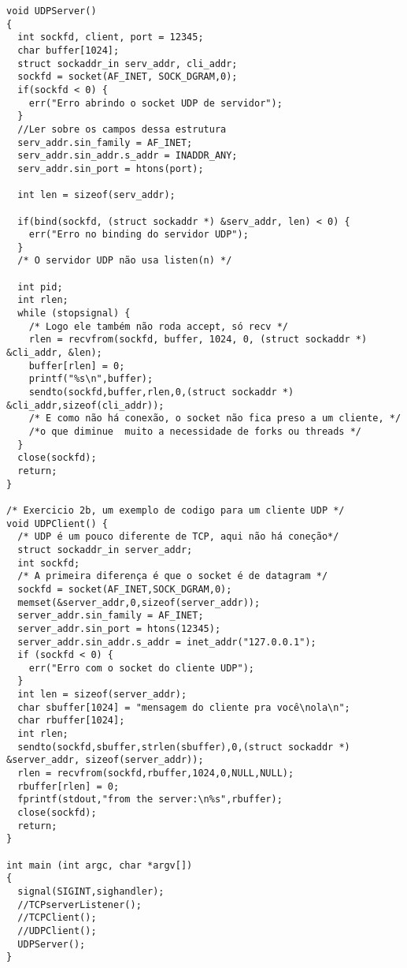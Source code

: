 \documentclass{article}
\begin{document}
\begin{verbatim}
void UDPServer()
{
  int sockfd, client, port = 12345;
  char buffer[1024];
  struct sockaddr_in serv_addr, cli_addr;
  sockfd = socket(AF_INET, SOCK_DGRAM,0);
  if(sockfd < 0) {
    err("Erro abrindo o socket UDP de servidor");
  }
  //Ler sobre os campos dessa estrutura
  serv_addr.sin_family = AF_INET;
  serv_addr.sin_addr.s_addr = INADDR_ANY;
  serv_addr.sin_port = htons(port);
  
  int len = sizeof(serv_addr);

  if(bind(sockfd, (struct sockaddr *) &serv_addr, len) < 0) {
    err("Erro no binding do servidor UDP");
  }
  /* O servidor UDP não usa listen(n) */

  int pid;
  int rlen;
  while (stopsignal) {
    /* Logo ele também não roda accept, só recv */
    rlen = recvfrom(sockfd, buffer, 1024, 0, (struct sockaddr *) &cli_addr, &len);
    buffer[rlen] = 0;
    printf("%s\n",buffer);
    sendto(sockfd,buffer,rlen,0,(struct sockaddr *) &cli_addr,sizeof(cli_addr));
    /* E como não há conexão, o socket não fica preso a um cliente, */
    /*o que diminue  muito a necessidade de forks ou threads */
  }
  close(sockfd);
  return;
}

/* Exercicio 2b, um exemplo de codigo para um cliente UDP */
void UDPClient() {
  /* UDP é um pouco diferente de TCP, aqui não há coneção*/
  struct sockaddr_in server_addr;
  int sockfd;
  /* A primeira diferença é que o socket é de datagram */
  sockfd = socket(AF_INET,SOCK_DGRAM,0);
  memset(&server_addr,0,sizeof(server_addr));
  server_addr.sin_family = AF_INET;
  server_addr.sin_port = htons(12345);
  server_addr.sin_addr.s_addr = inet_addr("127.0.0.1");
  if (sockfd < 0) {
    err("Erro com o socket do cliente UDP");
  }
  int len = sizeof(server_addr);
  char sbuffer[1024] = "mensagem do cliente pra você\nola\n";
  char rbuffer[1024];
  int rlen;
  sendto(sockfd,sbuffer,strlen(sbuffer),0,(struct sockaddr *) &server_addr, sizeof(server_addr));
  rlen = recvfrom(sockfd,rbuffer,1024,0,NULL,NULL);
  rbuffer[rlen] = 0;
  fprintf(stdout,"from the server:\n%s",rbuffer);
  close(sockfd);
  return;    
}

int main (int argc, char *argv[])
{
  signal(SIGINT,sighandler);
  //TCPserverListener();
  //TCPClient();
  //UDPClient();
  UDPServer();
}
\end{verbatim}
\end{document}
